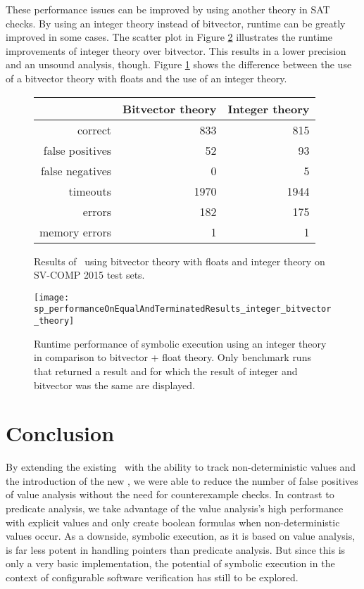 These performance issues can be improved by using another theory in SAT checks.
By using an integer theory instead of bitvector, runtime can be greatly improved in some cases.
The scatter plot in Figure \ref{graph:bitvecIntCompGraph} illustrates the runtime improvements of integer theory over bitvector.
This results in a lower precision and an unsound analysis, though.
Figure \ref{tab:bitvecIntComp} shows the difference between the use of a bitvector theory with floats and the use of an integer theory.
\begin{figure}
\begin{tabular}{| r || r | r |}
\hline
& Bitvector theory & Integer theory \\ \hline
correct         &  833 &  815 \\ \hline
false positives &   52 &   93 \\ \hline
false negatives &    0 &    5 \\ \hline
timeouts        & 1970 & 1944 \\ \hline
errors          &  182 &  175 \\ \hline
memory errors   &    1 &    1 \\ \hline
\end{tabular}
\caption{Results of \symbolicExecutionCPA\ using bitvector theory with floats and integer theory on SV-COMP 2015 test sets.}
\label{tab:bitvecIntComp}
\end{figure}

\begin{figure}
\texttt{[image: sp\_performanceOnEqualAndTerminatedResults\_integer\_bitvector\_theory]}
\caption{Runtime performance of symbolic execution using an integer theory in comparison to bitvector + float theory.
\label{graph:bitvecIntCompGraph}
         Only benchmark runs that returned a result and for which the result of integer and bitvector was the same are
         displayed.}
\end{figure}

\section{Conclusion}
By extending the existing \ with the ability to track non-deterministic values and the introduction of the new \constraintsCPA,
we were able to reduce the number of false positives of value analysis without the need for counterexample checks.
In contrast to predicate analysis, we take advantage of the value analysis's high performance with explicit values and only create boolean formulas when non-deterministic values occur.
As a downside, symbolic execution, as it is based on value analysis, is far less potent in handling pointers than predicate analysis.
But since this is only a very basic implementation, the potential of symbolic execution in the context of configurable software verification has still to be explored.

